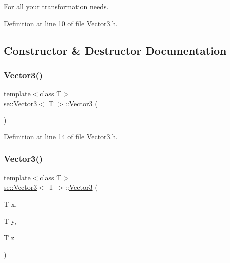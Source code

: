 For all your transformation needs. 

Definition at line 10 of file Vector3.\+h.



\subsection{Constructor \& Destructor Documentation}
\mbox{\label{classse_1_1_vector3_a9287277a349e2e99447b3eafe69bff5a}} 
\subsubsection{\texorpdfstring{Vector3()}{Vector3()}\hspace{0.1cm}{\footnotesize\ttfamily [1/2]}}
{\footnotesize\ttfamily template$<$class T$>$ \\
\mbox{\hyperlink{classse_1_1_vector3}{se\+::\+Vector3}}$<$ T $>$\+::\mbox{\hyperlink{classse_1_1_vector3}{Vector3}} (\begin{DoxyParamCaption}{ }\end{DoxyParamCaption})\hspace{0.3cm}{\ttfamily [inline]}}



Definition at line 14 of file Vector3.\+h.

\mbox{\label{classse_1_1_vector3_a6d5f0d6aded9d084a39013c928515724}} 
\subsubsection{\texorpdfstring{Vector3()}{Vector3()}\hspace{0.1cm}{\footnotesize\ttfamily [2/2]}}
{\footnotesize\ttfamily template$<$class T$>$ \\
\mbox{\hyperlink{classse_1_1_vector3}{se\+::\+Vector3}}$<$ T $>$\+::\mbox{\hyperlink{classse_1_1_vector3}{Vector3}} (\begin{DoxyParamCaption}\item[{T}]{x,  }\item[{T}]{y,  }\item[{T}]{z }\end{DoxyParamCaption})\hspace{0.3cm}{\ttfamily [inline]}}



